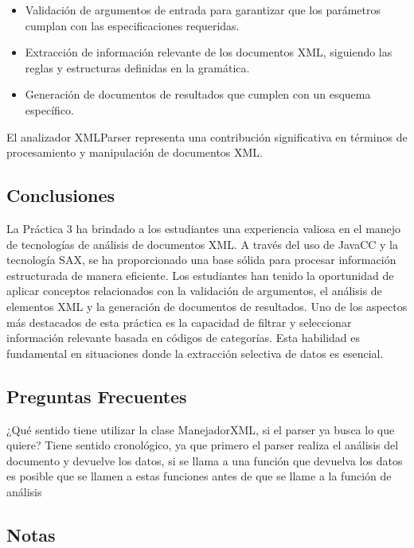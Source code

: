 \begin{itemize}
    \item Validación de argumentos de entrada para garantizar que los parámetros cumplan con las especificaciones requeridas.
    \item Extracción de información relevante de los documentos XML, siguiendo las reglas y estructuras definidas en la gramática.
    \item Generación de documentos de resultados que cumplen con un esquema específico.
\end{itemize}
El analizador XMLParser representa una contribución significativa en términos de procesamiento y manipulación de documentos XML.


\subsection{Conclusiones}

\noindent La Práctica 3 ha brindado a los estudiantes una experiencia valiosa en el manejo de tecnologías de análisis de documentos XML. A través del uso de JavaCC y la tecnología SAX, se ha proporcionado una base sólida para procesar información estructurada de manera eficiente. Los estudiantes han tenido la oportunidad de aplicar conceptos relacionados con la validación de argumentos, el análisis de elementos XML y la generación de documentos de resultados.
Uno de los aspectos más destacados de esta práctica es la capacidad de filtrar y seleccionar información relevante basada en códigos de categorías. Esta habilidad es fundamental en situaciones donde la extracción selectiva de datos es esencial.

\subsection{Preguntas Frecuentes}

\noindent ¿Qué sentido tiene utilizar la clase ManejadorXML, si el parser ya busca lo que quiere?
Tiene sentido cronológico, ya que primero el parser realiza el análisis del documento y devuelve los datos, si se llama a una función que devuelva los datos es posible que se llamen a estas funciones antes de que se llame a la función de análisis

\subsection{Notas}



